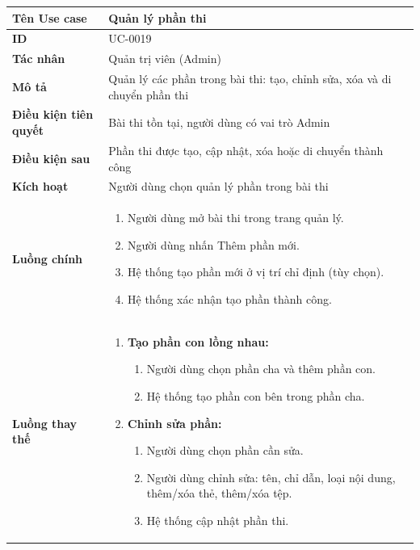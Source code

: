 {
\small
\renewcommand{\arraystretch}{1.15}

\begin{tabularx}{\textwidth}{|>{\raggedright\arraybackslash}p{3.5cm}|>{\raggedright\arraybackslash}X|}
\hline
\textbf{Tên Use case} & Quản lý phần thi \\
\hline
\textbf{ID} & UC-0019 \\
\hline
\textbf{Tác nhân} & Quản trị viên (Admin) \\
\hline
\textbf{Mô tả} & Quản lý các phần trong bài thi: tạo, chỉnh sửa, xóa và di chuyển phần thi \\
\hline
\textbf{Điều kiện tiên quyết} & Bài thi tồn tại, người dùng có vai trò Admin \\
\hline
\textbf{Điều kiện sau} & Phần thi được tạo, cập nhật, xóa hoặc di chuyển thành công \\
\hline
\textbf{Kích hoạt} & Người dùng chọn quản lý phần trong bài thi \\
\hline
\textbf{Luồng chính} &
\begin{enumerate}
    \item Người dùng mở bài thi trong trang quản lý.
    \item Người dùng nhấn Thêm phần mới.
    \item Hệ thống tạo phần mới ở vị trí chỉ định (tùy chọn).
    \item Hệ thống xác nhận tạo phần thành công.
\end{enumerate} \\
\hline
\textbf{Luồng thay thế} &
\begin{enumerate}
    \item \textbf{Tạo phần con lồng nhau:}
    \begin{enumerate}
        \item[2A.] Người dùng chọn phần cha và thêm phần con.
        \item[3A.] Hệ thống tạo phần con bên trong phần cha.
    \end{enumerate}
    \item \textbf{Chỉnh sửa phần:}
    \begin{enumerate}
        \item[2B.] Người dùng chọn phần cần sửa.
        \item[3B.] Người dùng chỉnh sửa: tên, chỉ dẫn, loại nội dung, thêm/xóa thẻ, thêm/xóa tệp.
        \item[4B.] Hệ thống cập nhật phần thi.
    \end{enumerate}

\end{enumerate}
\end{tabularx}}
